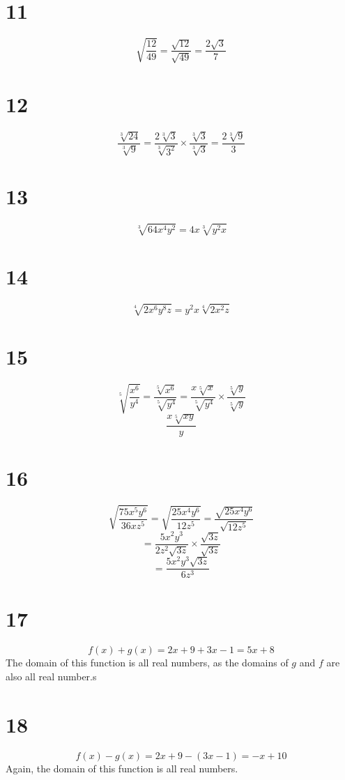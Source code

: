 \documentclass{article}
\theoremstyle{definition}
\newcommand{\?}{\stackrel{?}{=}}
\begin{document}
\section*{11}
\[ \sqrt{\frac{12}{49}}=\frac{\sqrt{12}}{\sqrt{49}}=\frac{2\sqrt{3}}{7} \]

\section*{12}
\[ \frac{\sqrt[3]{24}}{\sqrt[3]{9}}=\frac{2\sqrt[3]{3}}{\sqrt[3]{3^2}}\times\frac{\sqrt[3]{3}}{\sqrt[3]{3}}=\frac{2\sqrt[3]{9}}{3} \]

\section*{13}
\[ \sqrt[3]{64x^4y^2}=4x\sqrt[3]{y^2x} \]

\section*{14}
\[ \sqrt[4]{2x^6y^8z}=y^2x\sqrt[4]{2x^2z} \]

\section*{15}
\[ \sqrt[5]{\frac{x^6}{y^4}}=\frac{\sqrt[5]{x^6}}{\sqrt[5]{y^4}}=\frac{x\sqrt[5]{x}}{\sqrt[5]{y^4}}\times\frac{\sqrt[5]{y}}{\sqrt[5]{y}} \]
\[ \frac{x\sqrt[5]{xy}}{y} \]

\section*{16}
\[ \sqrt{\frac{75x^5y^6}{36xz^5}}=\sqrt{\frac{25x^4y^6}{12z^5}}=\frac{\sqrt{25x^4y^6}}{\sqrt{12z^5}} \]
\[ =\frac{5x^2y^3}{2z^2\sqrt{3z}}\times\frac{\sqrt{3z}}{\sqrt{3z}} \] \[ =\frac{5x^2y^3\sqrt{3z}}{6z^3} \]

\section*{17}
\[ f(x)+g(x)=2x+9+3x-1=5x+8 \]
The domain of this function is all real numbers, as the domains of $g$ and $f$ are also all real number.s

\section*{18}
\[ f(x)-g(x)=2x+9-(3x-1)=-x+10 \]
Again, the domain of this function is all real numbers.
\end{document}
